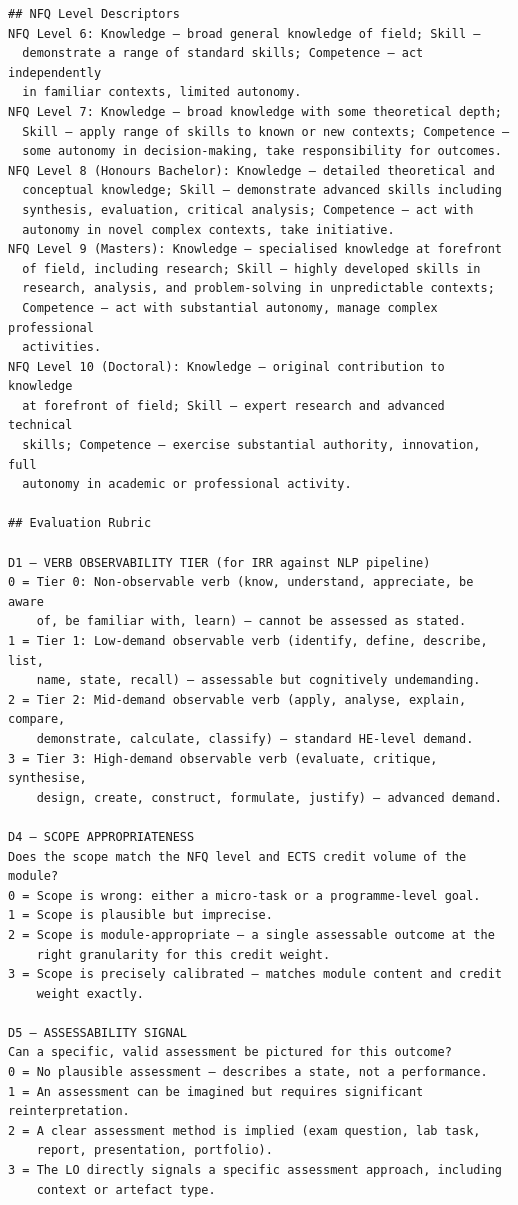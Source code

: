 \documentclass[12pt, a4paper]{article}
\begin{document}
\begin{small}
\begin{verbatim}
## NFQ Level Descriptors
NFQ Level 6: Knowledge — broad general knowledge of field; Skill —
  demonstrate a range of standard skills; Competence — act independently
  in familiar contexts, limited autonomy.
NFQ Level 7: Knowledge — broad knowledge with some theoretical depth;
  Skill — apply range of skills to known or new contexts; Competence —
  some autonomy in decision-making, take responsibility for outcomes.
NFQ Level 8 (Honours Bachelor): Knowledge — detailed theoretical and
  conceptual knowledge; Skill — demonstrate advanced skills including
  synthesis, evaluation, critical analysis; Competence — act with
  autonomy in novel complex contexts, take initiative.
NFQ Level 9 (Masters): Knowledge — specialised knowledge at forefront
  of field, including research; Skill — highly developed skills in
  research, analysis, and problem-solving in unpredictable contexts;
  Competence — act with substantial autonomy, manage complex professional
  activities.
NFQ Level 10 (Doctoral): Knowledge — original contribution to knowledge
  at forefront of field; Skill — expert research and advanced technical
  skills; Competence — exercise substantial authority, innovation, full
  autonomy in academic or professional activity.

## Evaluation Rubric

D1 — VERB OBSERVABILITY TIER (for IRR against NLP pipeline)
0 = Tier 0: Non-observable verb (know, understand, appreciate, be aware
    of, be familiar with, learn) — cannot be assessed as stated.
1 = Tier 1: Low-demand observable verb (identify, define, describe, list,
    name, state, recall) — assessable but cognitively undemanding.
2 = Tier 2: Mid-demand observable verb (apply, analyse, explain, compare,
    demonstrate, calculate, classify) — standard HE-level demand.
3 = Tier 3: High-demand observable verb (evaluate, critique, synthesise,
    design, create, construct, formulate, justify) — advanced demand.

D4 — SCOPE APPROPRIATENESS
Does the scope match the NFQ level and ECTS credit volume of the module?
0 = Scope is wrong: either a micro-task or a programme-level goal.
1 = Scope is plausible but imprecise.
2 = Scope is module-appropriate — a single assessable outcome at the
    right granularity for this credit weight.
3 = Scope is precisely calibrated — matches module content and credit
    weight exactly.

D5 — ASSESSABILITY SIGNAL
Can a specific, valid assessment be pictured for this outcome?
0 = No plausible assessment — describes a state, not a performance.
1 = An assessment can be imagined but requires significant reinterpretation.
2 = A clear assessment method is implied (exam question, lab task,
    report, presentation, portfolio).
3 = The LO directly signals a specific assessment approach, including
    context or artefact type.


\end{verbatim}
\end{small}
\end{document}
